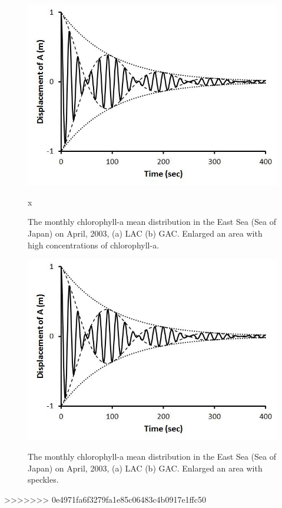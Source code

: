   \begin{figure}[h]
  	\centering
  	\includegraphics[width=0.8\linewidth]{../images/monHISHI}\\
  	\caption{The monthly chlorophyll-a mean distribution in the East Sea (Sea of Japan) on April, 2003, (a) LAC (b) GAC. Enlarged an area with high concentrations of chlorophyll-a.}
  	\label{fig:monHISHI}x
  \end{figure}
  
    \begin{figure}[h]
  	\centering
  	\includegraphics[width=0.8\linewidth]{../images/monHISSPEC}\\
  	\caption{The monthly chlorophyll-a mean distribution in the East Sea (Sea of Japan) on April, 2003, (a) LAC (b) GAC. Enlarged an area with speckles.}
  	\label{fig:monHISSPEC}
  \end{figure}
>>>>>>> 0e4971fa6f3279fa1e85c06483c4b0917e1ffc50
  